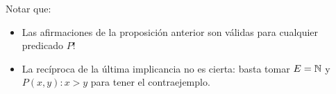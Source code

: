 \begin{nota}
	Notar que: 
	\begin{itemize}
		\item Las afirmaciones de la proposición anterior son válidas para cualquier predicado $P$! 
		\item La recíproca de la última implicancia no es cierta: basta tomar $E = \mathbb{N}$ y $P(x,y): x > y$ para tener el contraejemplo. 
	\end{itemize}
\end{nota}